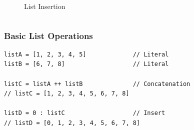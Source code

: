 \documentclass{beamer}
\begin{document}
\begin{frame}[fragile=singleslide]
\begin{columns}[c]
\begin{column}[T]{5cm}
\begin{figure}
{
                    }
                    \caption{List Insertion}
                \end{figure}
            \end{column}
        \end{columns}
    \end{frame}

    \begin{frame}[fragile=singleslide]
        \frametitle{Basic List Operations}

        \begin{lstlisting}
listA = [1, 2, 3, 4, 5]             // Literal
listB = [6, 7, 8]                   // Literal

listC = listA ++ listB              // Concatenation
// listC = [1, 2, 3, 4, 5, 6, 7, 8]

listD = 0 : listC                   // Insert
// listD = [0, 1, 2, 3, 4, 5, 6, 7, 8]
        \end{lstlisting}
    \end{frame}
\end{document}
